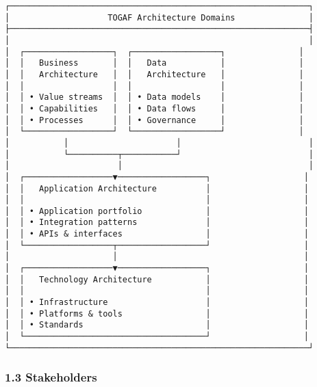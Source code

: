 \documentclass[
]{article}
\begin{document}
\begin{verbatim}
┌─────────────────────────────────────────────────────────────┐
│                    TOGAF Architecture Domains               │
├─────────────────────────────────────────────────────────────┤
│                                                             │
│  ┌──────────────────┐  ┌──────────────────┐               │
│  │   Business       │  │   Data           │               │
│  │   Architecture   │  │   Architecture   │               │
│  │                  │  │                  │               │
│  │ • Value streams  │  │ • Data models    │               │
│  │ • Capabilities   │  │ • Data flows     │               │
│  │ • Processes      │  │ • Governance     │               │
│  └──────────────────┘  └──────────────────┘               │
│           │                      │                          │
│           └──────────┬───────────┘                          │
│                      │                                      │
│  ┌──────────────────▼──────────────────┐                   │
│  │   Application Architecture          │                   │
│  │                                     │                   │
│  │ • Application portfolio             │                   │
│  │ • Integration patterns              │                   │
│  │ • APIs & interfaces                 │                   │
│  └──────────────────┬──────────────────┘                   │
│                     │                                      │
│  ┌──────────────────▼──────────────────┐                   │
│  │   Technology Architecture           │                   │
│  │                                     │                   │
│  │ • Infrastructure                    │                   │
│  │ • Platforms & tools                 │                   │
│  │ • Standards                         │                   │
│  └─────────────────────────────────────┘                   │
└─────────────────────────────────────────────────────────────┘
\end{verbatim}

\hypertarget{stakeholders}{%
\subsubsection{1.3 Stakeholders}\label{stakeholders}}
\end{document}
